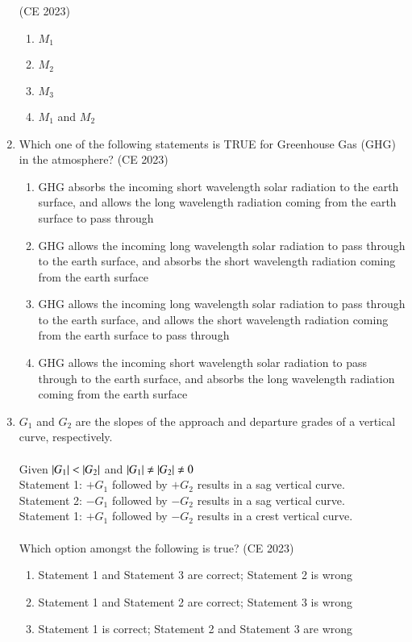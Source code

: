 \documentclass[journal,12pt,onecolumn]{IEEEtran}
\theoremstyle{remark}
\begin{document}
\begin{enumerate}
\hfill{(CE 2023)}
\begin{enumerate}
\item $M_1$
\item $M_2$
\item $M_3$
\item $M_1$ and $M_2$
\end{enumerate}
\item Which one of the following statements is TRUE for Greenhouse Gas (GHG) in the
atmosphere?
\hfill{(CE 2023)}
\begin{enumerate}
\item GHG absorbs the incoming short wavelength solar radiation to the earth surface,
and allows the long wavelength radiation coming from the earth surface to pass
through
\item GHG allows the incoming long wavelength solar radiation to pass through to the
earth surface, and absorbs the short wavelength radiation coming from the earth
surface
\item GHG allows the incoming long wavelength solar radiation to pass through to the
earth surface, and allows the short wavelength radiation coming from the earth
surface to pass through
\item GHG allows the incoming short wavelength solar radiation to pass through to the
earth surface, and absorbs the long wavelength radiation coming from the earth
surface
\end{enumerate}
\item $G_1$ and $G_2$ are the slopes of the approach and departure grades of a vertical curve,
respectively.\\ \\
Given $\left\vert G_1\right\vert < \left\vert G_2\right\vert$ and $\left\vert G_1\right\vert \neq \left\vert G_2\right\vert \neq 0$\\
Statement 1: $+G_1$ followed by $+G_2$ results in a sag vertical curve.\\
Statement 2: $-G_1$ followed by $-G_2$ results in a sag vertical curve.\\
Statement 1: $+G_1$ followed by $-G_2$ results in a crest vertical curve.\\ \\
Which option amongst the following is true?
\hfill{(CE 2023)}
\begin{enumerate}
\item Statement 1 and Statement 3 are correct; Statement 2 is wrong
\item Statement 1 and Statement 2 are correct; Statement 3 is wrong
\item Statement 1 is correct; Statement 2 and Statement 3 are wrong

\end{enumerate}
\end{enumerate}
\end{document}

